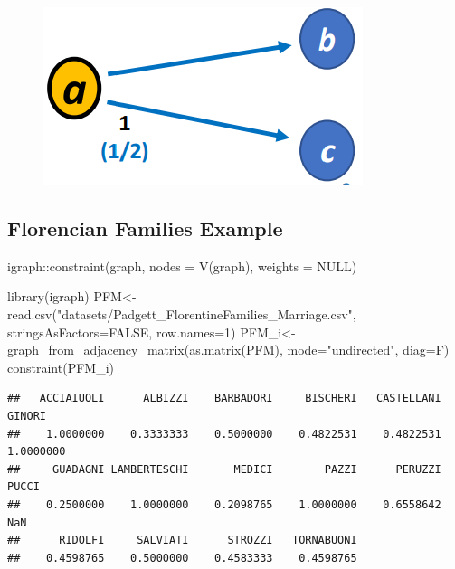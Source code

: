 \documentclass[
  notitlepage,
  onecolumn,
  openany]{book}
\newenvironment{Shaded}{\begin{snugshade}}{\end{snugshade}}
\newcommand{\AttributeTok}[1]{\textcolor[rgb]{0.77,0.63,0.00}{#1}}
\newcommand{\ConstantTok}[1]{\textcolor[rgb]{0.00,0.00,0.00}{#1}}
\newcommand{\DecValTok}[1]{\textcolor[rgb]{0.00,0.00,0.81}{#1}}
\newcommand{\FunctionTok}[1]{\textcolor[rgb]{0.00,0.00,0.00}{#1}}
\newcommand{\NormalTok}[1]{#1}
\newcommand{\OtherTok}[1]{\textcolor[rgb]{0.56,0.35,0.01}{#1}}
\newcommand{\SpecialCharTok}[1]{\textcolor[rgb]{0.00,0.00,0.00}{#1}}
\newcommand{\StringTok}[1]{\textcolor[rgb]{0.31,0.60,0.02}{#1}}
\begin{document}
\begin{figure}[h!]

{\centering \includegraphics[width=0.4\linewidth]{images/08-Metrics for structural holes/Untitled 3} 

}

\end{figure}

\hypertarget{florencian-families-example}{%
\subsection{Florencian Families Example}\label{florencian-families-example}}

\begin{Shaded}
\begin{Highlighting}[]
\NormalTok{igraph}\SpecialCharTok{::}\FunctionTok{constraint}\NormalTok{(graph, }\AttributeTok{nodes =} \FunctionTok{V}\NormalTok{(graph), }\AttributeTok{weights =} \ConstantTok{NULL}\NormalTok{)}
\end{Highlighting}
\end{Shaded}

\begin{Shaded}
\begin{Highlighting}[]
\FunctionTok{library}\NormalTok{(igraph)}
\NormalTok{PFM}\OtherTok{\textless{}{-}}\FunctionTok{read.csv}\NormalTok{(}\StringTok{"datasets/Padgett\_FlorentineFamilies\_Marriage.csv"}\NormalTok{,}
                            \AttributeTok{stringsAsFactors=}\ConstantTok{FALSE}\NormalTok{,}
                            \AttributeTok{row.names=}\DecValTok{1}\NormalTok{)}
\NormalTok{PFM\_i}\OtherTok{\textless{}{-}}\FunctionTok{graph\_from\_adjacency\_matrix}\NormalTok{(}\FunctionTok{as.matrix}\NormalTok{(PFM),}
                                   \AttributeTok{mode=}\StringTok{"undirected"}\NormalTok{,}
                                   \AttributeTok{diag=}\NormalTok{F)}
\FunctionTok{constraint}\NormalTok{(PFM\_i)}
\end{Highlighting}
\end{Shaded}

\begin{verbatim}
##   ACCIAIUOLI      ALBIZZI    BARBADORI     BISCHERI   CASTELLANI       GINORI 
##    1.0000000    0.3333333    0.5000000    0.4822531    0.4822531    1.0000000 
##     GUADAGNI LAMBERTESCHI       MEDICI        PAZZI      PERUZZI        PUCCI 
##    0.2500000    1.0000000    0.2098765    1.0000000    0.6558642          NaN 
##      RIDOLFI     SALVIATI      STROZZI   TORNABUONI 
##    0.4598765    0.5000000    0.4583333    0.4598765
\end{verbatim}
\end{document}
